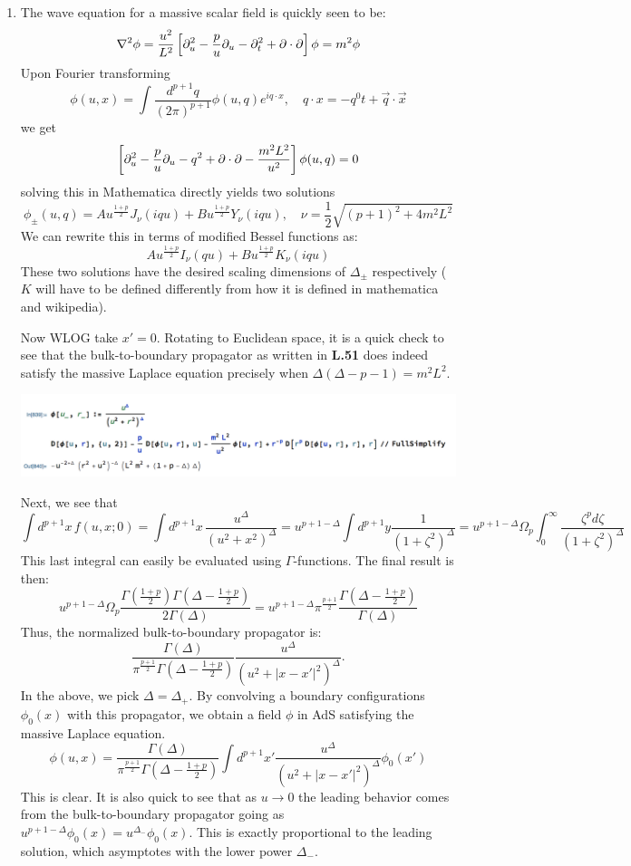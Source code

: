 \documentclass[11pt, class=article, crop=false]{standalone}
\begin{document}
\begin{enumerate}
	
	\item The wave equation for a massive scalar field is quickly seen to be:
	\[
		\nabla^2 \phi = \frac{u^2}{L^2} \left[\partial_u^2 - \frac{p}{u} \partial_u - \partial_t^2 + \partial \cdot \partial \right] \phi = m^2 \phi 
	\]
	Upon Fourier transforming
	\[
		\phi(u, x) = \int \frac{d^{p+1} q}{(2 \pi)^{p+1}} \phi(u, q) e^{i q \cdot x}, \quad q \cdot x = - q^0 t + \vec q \cdot \vec x
	\]
	we get
	\[
		 \left[\partial_u^2 - \frac{p}{u} \partial_u - q^2 + \partial \cdot \partial - \frac{m^2 L^2}{u^2} \right] \phi(u, q) = 0
	\]
	solving this in Mathematica directly yields two solutions
	\[
		\phi_\pm(u, q) = A u^{\frac{1+p}{2}} J_\nu ( i q u ) + B u^{\frac{1+p}{2}} Y_\nu ( i q u ), \quad \nu = \frac12 \sqrt{(p+1)^2 + 4 m^2 L^2}
	\]
	We can rewrite this in terms of modified Bessel functions as:
	\[
		A u^{\frac{1+p}{2}} I_\nu (  q u ) + B u^{\frac{1+p}{2}} K_\nu ( i q u )
	\]
	These two solutions have the desired scaling dimensions of $\Delta_\pm$ respectively ($K$ will have to be defined differently from how it is defined in mathematica and wikipedia).
	
	Now WLOG take $x' = 0$. Rotating to Euclidean space, it is a quick check to see that the bulk-to-boundary propagator as written in \textbf{L.51} does indeed satisfy the massive Laplace equation precisely when $\Delta (\Delta - p - 1) = m^2 L^2$.
	\begin{center}
		\includegraphics[scale=0.5]{"Figures/Bulk-to-Boundary"}
	\end{center}
	
	Next, we see that
	\[
		\int d^{p+1} x \, f(u, x; 0) = \int d^{p+1} x\, \frac{u^\Delta}{(u^2 + x^2)^\Delta} = u^{p+1-\Delta} \int d^{p+1} y \frac{1}{(1+\zeta^2)^\Delta} = u^{p+1-\Delta} \Omega_{p} \int_0^\infty \frac{\zeta^p d\zeta}{(1 + \zeta^2)^\Delta}
	\]
	This last integral can easily be evaluated using $\Gamma$-functions. The final result is then:
	\[
		u^{p+1-\Delta} \Omega_{p} \frac{\Gamma(\frac{1+p}{2}) \Gamma(\Delta - \frac{1+p}{2})}{2\Gamma(\Delta)} = u^{p+1-\Delta} \pi^{\frac{p+1}{2}} \frac{\Gamma(\Delta - \frac{1+p}{2})}{\Gamma(\Delta)}
	\]
	Thus, the normalized bulk-to-boundary propagator is:
	\[
		\frac{\Gamma(\Delta)}{\pi^{\frac{p+1}{2}}  \Gamma(\Delta -  \frac{1+p}{2})} \frac{u^\Delta}{(u^2 + |x-x'|^2)^\Delta}.
	\]
	In the above, we pick $\Delta = \Delta_+$. By convolving a boundary configurations $\phi_0(x)$ with this propagator, we obtain a field $\phi$ in AdS satisfying the massive Laplace equation. 
	\[
		\phi(u, x) = \frac{\Gamma(\Delta)}{\pi^{\frac{p+1}{2}}  \Gamma(\Delta -  \frac{1+p}{2})} \int d^{p+1} x' \frac{u^\Delta}{(u^2 + |x-x'|^2)^\Delta} \phi_0(x')
	\]
	This is clear. It is also quick to see that as $u \to 0$ the leading behavior comes from the bulk-to-boundary propagator going as $u^{p+1-\Delta}  \phi_0(x) = u^{\Delta_-} \phi_0(x)$. This is exactly proportional to the leading solution, which asymptotes with the lower power $\Delta_-$.
	

\end{enumerate}
\end{document}
